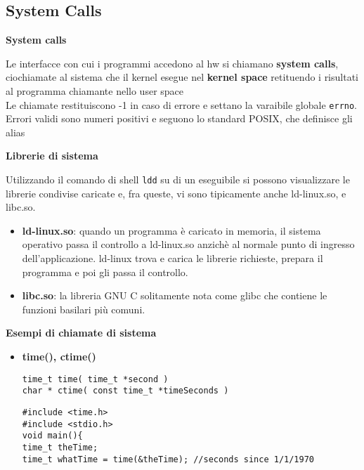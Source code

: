 \begin{flushleft}
  \subsection{System Calls}
  \begin{flushleft}
    \textbf{System calls} \par 
    Le interfacce con cui i programmi accedono al hw si chiamano \textbf{system calls}, cio\ace chiamate al sistema 
    che il kernel esegue nel \textbf{kernel space} retituendo i risultati al programma chiamante nello user space \\
    Le chiamate restituiscono -1 in caso di errore e settano la varaibile globale \texttt{errno}. Errori validi sono numeri 
    positivi e seguono lo standard POSIX, che definisce gli alias \par 
    \textbf{Librerie di sistema} \par 
    Utilizzando il comando di shell \texttt{ldd} su di un eseguibile si possono visualizzare le 
    librerie condivise caricate e, fra queste, vi sono tipicamente anche ld-linux.so, e 
    libc.so.
    \begin{itemize}
      \item \textbf{ld-linux.so}: quando un programma è caricato in memoria, il sistema operativo 
      passa il controllo a ld-linux.so anzichè al normale punto di ingresso 
      dell’applicazione. ld-linux trova e carica le librerie richieste, prepara il 
      programma e poi gli passa il controllo.
      \item \textbf{libc.so}: la libreria GNU C solitamente nota come glibc che contiene le funzioni 
      basilari più comuni.
    \end{itemize}
    \textbf{Esempi di chiamate di sistema} \par 
    \begin{itemize}
      \item \textbf{time(), ctime()} \par 
            \texttt{time\_t time( time\_t *second )\\
                    char * ctime( const time\_t *timeSeconds )}\par 
            \texttt{\#include <time.h> \\
                    \#include <stdio.h>\\
                    void main()\{ \\
                    \halftab time\_t theTime;\\
                    \halftab time\_t whatTime = time(\&theTime); //seconds since 1/1/1970\\
}
\end{itemize}
\end{flushleft}
\end{flushleft}
